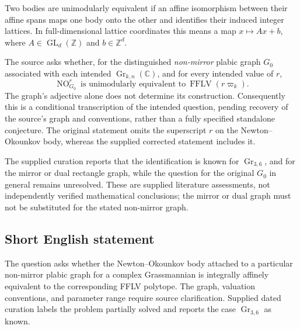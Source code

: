 \documentclass[11pt]{article}
\newcommand{\Z}{\mathbb{Z}}
\newcommand{\C}{\mathbb{C}}
\begin{document}
Two bodies are unimodularly equivalent if an affine isomorphism between their affine spans maps one body onto the other and identifies their induced integer lattices. In full-dimensional lattice coordinates this means a map \(x\mapsto Ax+b\), where \(A\in\operatorname{GL}_d(\Z)\) and \(b\in\Z^d\).

The source asks whether, for the distinguished \emph{non-mirror} plabic graph \(G_0\) associated with each intended \(\operatorname{Gr}_{k,n}(\C)\), and for every intended value of \(r\),
\[
\operatorname{NO}_{G_0}^{r}\ \text{is unimodularly equivalent to}\ \operatorname{FFLV}(r\varpi_k).
\]
The graph's adjective alone does not determine its construction. Consequently this is a conditional transcription of the intended question, pending recovery of the source's graph and conventions, rather than a fully specified standalone conjecture. The original statement omits the superscript \(r\) on the Newton--Okounkov body, whereas the supplied corrected statement includes it.

The supplied curation reports that the identification is known for \(\operatorname{Gr}_{3,6}\), and for the mirror or dual rectangle graph, while the question for the original \(G_0\) in general remains unresolved. These are supplied literature assessments, not independently verified mathematical conclusions; the mirror or dual graph must not be substituted for the stated non-mirror graph.
\subsection{Short English statement}
The question asks whether the Newton--Okounkov body attached to a particular non-mirror plabic graph for a complex Grassmannian is integrally affinely equivalent to the corresponding FFLV polytope. The graph, valuation conventions, and parameter range require source clarification. Supplied dated curation labels the problem partially solved and reports the case \(\operatorname{Gr}_{3,6}\) as known.
\end{document}
